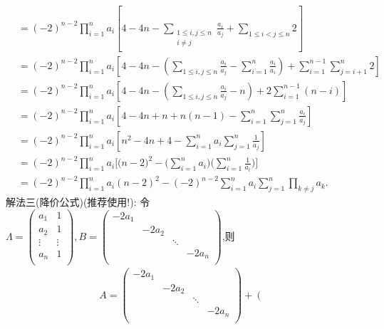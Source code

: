 \documentclass[../../main.tex]{subfiles}
\begin{document}
\begin{solution}
\begin{enumerate}[(1)]
\begin{align*}
&=\left( -2 \right) ^{n-2}\prod_{i=1}^n{a_i}\left[ 4-4n-\sum_{\substack{
1\leqslant i,j\leqslant n\\
i\ne j\\
}}{\frac{a_i}{a_j}}+\sum_{1\leqslant i<j\leqslant n}{2} \right] 
\\
&=\left( -2 \right) ^{n-2}\prod_{i=1}^n{a_i}\left[ 4-4n-\left( \sum_{1\leqslant i,j\leqslant n}{\frac{a_i}{a_j}}-\sum_{i=1}^n{\frac{a_i}{a_i}} \right) +\sum_{i=1}^{n-1}{\sum_{j=i+1}^n{2}} \right] 
\\
&=\left( -2 \right) ^{n-2}\prod_{i=1}^n{a_i}\left[ 4-4n-\left( \sum_{1\leqslant i,j\leqslant n}{\frac{a_i}{a_j}}-n \right) +2\sum_{i=1}^{n-1}{\left( n-i \right)} \right] 
\\
&=\left( -2 \right) ^{n-2}\prod_{i=1}^n{a_i}\left[ 4-4n+n+n\left( n-1 \right) -\sum_{i=1}^n{\sum_{j=1}^n{\frac{a_i}{a_j}}} \right] 
\\
&=\left( -2 \right) ^{n-2}\prod_{i=1}^n{a_i}\left[ n^2-4n+4-\sum_{i=1}^n{a_i\sum_{j=1}^n{\frac{1}{a_j}}} \right] 
\\
&=\left( -2 \right) ^{n-2}\prod_{i=1}^n{a_i[(n}-2)^2-(\sum_{i=1}^n{a_i)(\sum_{i=1}^n{\frac{1}{a_i})]}}
\\
&=(-2)^{n-2}\prod_{i=1}^n{a_i}\left( n-2 \right) ^2-(-2)^{n-2}\sum_{i=1}^n{a_i}\sum_{j=1}^n{\prod_{k\ne j}{a_k}}.
\end{align*}
{\color{blue}解法三(降价公式)(推荐使用!):}
令$\varLambda=\left( \begin{matrix}
a_1&		1\\
a_2&		1\\
\vdots&		\vdots\\
a_n&		1\\
\end{matrix} \right) ,B=\left( \begin{matrix}
-2a_1&		&		&		\\
&		-2a_2&		&		\\
&		&		\ddots&		\\
&		&		&		-2a_n\\
\end{matrix} \right) $,则
\begin{align*}
A=\left( \begin{matrix}
-2a_1&		&		&		\\
&		-2a_2&		&		\\
&		&		\ddots&		\\
&		&		&		-2a_n\\
\end{matrix} \right) +\left( \begin{matrix}

\end{matrix}
\end{align*}
\end{enumerate}
\end{solution}
\end{document}

